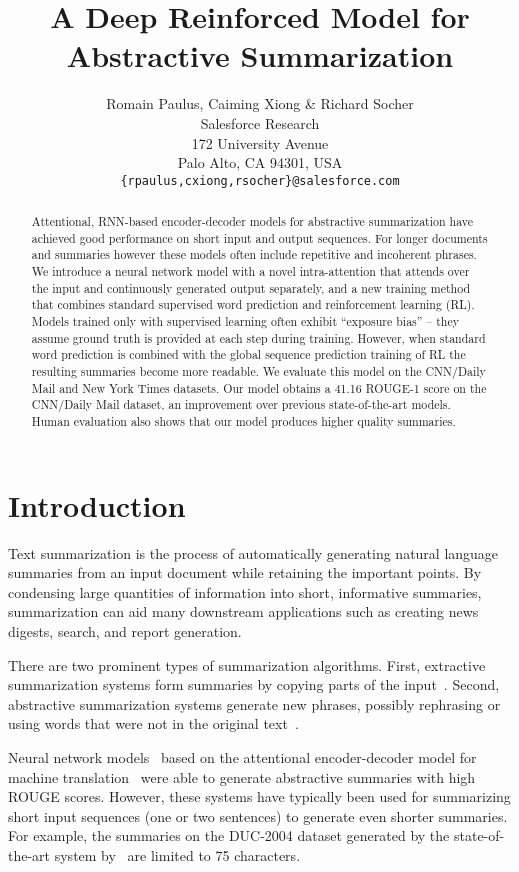 \documentclass{article} \usepackage{iclr2018_arxiv,times}
\title{A Deep Reinforced Model for Abstractive Summarization}
\author{Romain Paulus, Caiming Xiong \& Richard Socher \\
Salesforce Research\\
172 University Avenue\\
Palo Alto, CA 94301, USA \\
\texttt{\{rpaulus,cxiong,rsocher\}@salesforce.com}
}
\begin{document}
\maketitle

\begin{abstract}
Attentional, RNN-based encoder-decoder models for abstractive summarization have achieved good performance on short input and output sequences. For longer documents and summaries however these models often include repetitive and incoherent phrases. We introduce a neural network model with a novel intra-attention that attends over the input and continuously generated output separately, and a new training method that combines standard supervised word prediction and reinforcement learning (RL). 
Models trained only with supervised learning often exhibit ``exposure bias'' -- they assume ground truth is provided at each step during training.
However, when standard word prediction is combined with the global sequence prediction training of RL the resulting summaries become more readable.
We evaluate this model on the CNN/Daily Mail and New York Times datasets. Our model obtains a 41.16 ROUGE-1 score on the CNN/Daily Mail dataset, an improvement over previous state-of-the-art models. Human evaluation also shows that our model produces higher quality summaries.

\end{abstract}

\section{Introduction}

Text summarization is the process of automatically generating natural language summaries from an input document while retaining the important points. By condensing large quantities of information into short, informative summaries, summarization can aid many downstream applications such as creating news digests, search, and report generation.

There are two prominent types of summarization algorithms.
First, extractive summarization systems form summaries by copying parts of the input~\citep{dorr2003,nallapati2017}.
Second, abstractive summarization systems generate new phrases, possibly rephrasing or using words that were not in the original text~\citep{chopra2016,nallapati2016}.

Neural network models~\citep{nallapati2016} based on the attentional encoder-decoder model for machine translation~\citep{bahdanau2014} were able to generate abstractive summaries with high ROUGE scores.
However, these systems have typically been used for summarizing short input sequences (one or two sentences) to generate even shorter summaries.
For example, the summaries on the DUC-2004 dataset generated by the state-of-the-art system  by~\citet{zeng2016} are limited to 75 characters.
\end{document}
